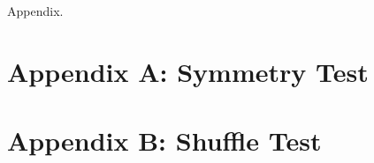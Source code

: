 Appendix.

\section{Appendix A: Symmetry Test}



















\section{Appendix B: Shuffle Test}


